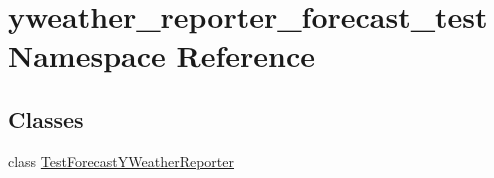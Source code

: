 \hypertarget{namespaceyweather__reporter__forecast__test}{\section{yweather\-\_\-reporter\-\_\-forecast\-\_\-test Namespace Reference}
\label{namespaceyweather__reporter__forecast__test}
}
\subsection*{Classes}
\begin{DoxyCompactItemize}
\item 
class \hyperlink{classyweather__reporter__forecast__test_1_1TestForecastYWeatherReporter}{Test\-Forecast\-Y\-Weather\-Reporter}
\end{DoxyCompactItemize}
